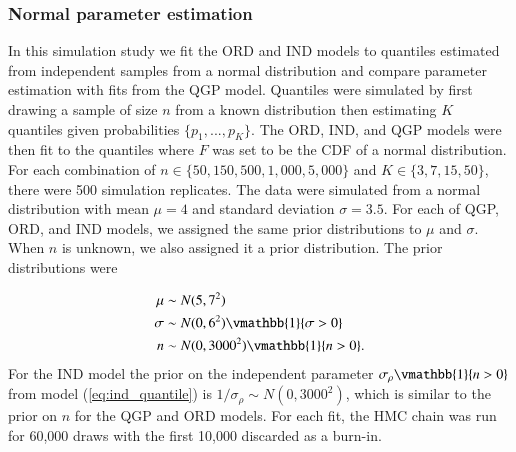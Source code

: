 \documentclass[preprint,12pt,authoryear]{elsarticle}
\begin{document}
\subsubsection{Normal parameter estimation}
In this simulation study we fit the ORD and IND models to quantiles estimated from independent samples from a normal distribution and compare parameter estimation with fits from the QGP model. Quantiles were simulated by first drawing a sample of size $n$ from a known distribution then estimating $K$ quantiles given probabilities $\{p_1, ..., p_K\}$. The ORD, IND, and QGP models were then fit to the quantiles where $F$ was set to be the CDF of a normal distribution. For each combination of $n \in \{50, 150, 500, 1{,}000, 5{,}000\}$ and $K \in \{3,7,15,50\}$, there were 500 simulation replicates. The data were simulated from a normal distribution with mean $\mu = 4$ and standard deviation $\sigma = 3.5$.
For each of QGP, ORD, and IND models, we assigned the same prior distributions to $\mu$ and $\sigma$. When $n$ is unknown, we also assigned it a prior distribution. The prior distributions were

\begin{align*}
    \mu &\sim N(5,7^2) \\
    \sigma &\sim N(0, 6^2) \vmathbb{1}\{\sigma > 0\}\\
    n &\sim N(0,3000^2)\vmathbb{1}\{n > 0\}.
\end{align*}
For the IND model the prior on the independent parameter $\sigma_{\rho}\vmathbb{1}\{n > 0\}$ from model (\ref{eq:ind_quantile}) is $1/\sigma_{\rho} \sim N(0, 3000^2)$, which is similar to the prior on $n$ for the QGP and ORD models. For each fit, the HMC chain was run for 60,000 draws with the first 10,000 discarded as a burn-in.
\end{document}

